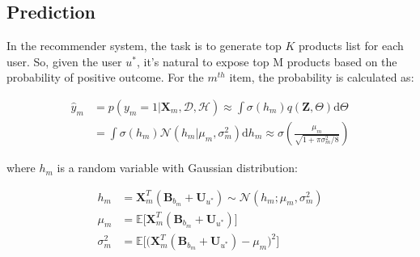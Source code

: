 \subsection{Prediction}

In the recommender system, the task is to generate top $K$ products list for each user. So, given the user $u^*$,  it's natural to expose top M products based on the probability of positive outcome. For the $m^{th}$ item, the probability is calculated as:

\begin{equation}
\label{prediction}
\begin{split}
\hat{y}_m & = p(y_m=1|\bm{X}_m,\mathcal{D},\mathcal{H}) \approx \int \sigma(h_{m})q(\bm{Z},\Theta)\mathrm{d}\Theta \nonumber \\
& = \int \sigma(h_{m})\mathcal{N}(h_{m}|\mu_{m},\sigma^2_{m})\mathrm{d}h_{m} \approx \sigma(\frac{\mu_{m}}{\sqrt{1+\pi\sigma^2_{m}/8}})
\end{split}
\end{equation}

\noindent where $h_{m}$ is a random variable with Gaussian distribution:

\begin{align*}
 h_{m}  & =\bm{X}_m^T(\bm{B}_{b_m}+\bm{U}_{u^*})  \sim \mathcal{N}(h_{m};\mu_{m},\sigma^2_{m}) \\ 
\mu_{m} & =\mathbb{E}\big[\bm{X}_m^T(\bm{B}_{b_m}+\bm{U}_{u^*})\big] \\ 
\sigma^2_{m} & =\mathbb{E}\Big[\big(\bm{X}_m^T(\bm{B}_{b_m}+\bm{U}_{u^*})-\mu_{m}\big)^2\Big]
\end{align*}
